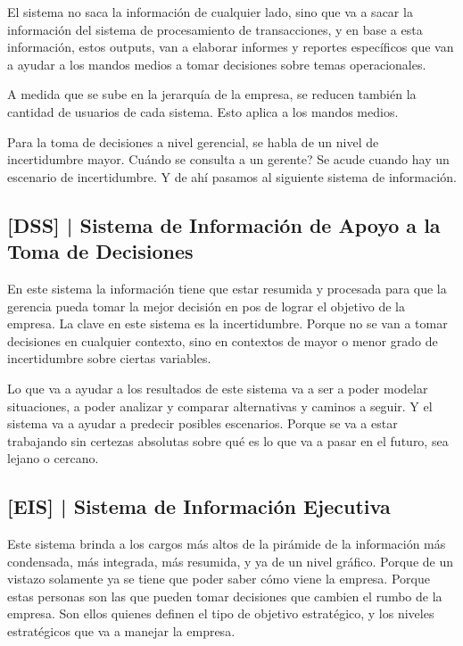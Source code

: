 El sistema no saca la información de cualquier lado, sino que va a sacar
la información del sistema de procesamiento de transacciones, y en base
a esta información, estos outputs, van a elaborar informes y reportes
específicos que van a ayudar a los mandos medios a tomar decisiones
sobre temas operacionales.

A medida que se sube en la jerarquía de la empresa, se reducen también
la cantidad de usuarios de cada sistema. Esto aplica a los mandos
medios.

Para la toma de decisiones a nivel gerencial, se habla de un nivel de
incertidumbre mayor. Cuándo se consulta a un gerente? Se acude cuando
hay un escenario de incertidumbre. Y de ahí pasamos al siguiente sistema
de información.

\hypertarget{sistema-de-informaciuxf3n-de-apoyo-a-la-toma-de-decisiones}{%
\subsection{%
{[}DSS{]} |
Sistema de Información de Apoyo a la Toma de Decisiones
}\label{sistema-de-informaciuxf3n-de-apoyo-a-la-toma-de-decisiones}}

En este sistema la información tiene que estar resumida y procesada para
que la gerencia pueda tomar la mejor decisión en pos de lograr el
objetivo de la empresa. La clave en este sistema es la incertidumbre.
Porque no se van a tomar decisiones en cualquier contexto, sino en
contextos de mayor o menor grado de incertidumbre sobre ciertas
variables.

Lo que va a ayudar a los resultados de este sistema va a ser a poder
modelar situaciones, a poder analizar y comparar alternativas y caminos
a seguir. Y el sistema va a ayudar a predecir posibles escenarios.
Porque se va a estar trabajando sin certezas absolutas sobre qué es lo
que va a pasar en el futuro, sea lejano o cercano.

\hypertarget{sistema-de-informaciuxf3n-ejecutiva}{%
\subsection{%
{[}EIS{]} |
Sistema de Información Ejecutiva
}\label{sistema-de-informaciuxf3n-ejecutiva}}

Este sistema brinda a los cargos más altos de la pirámide de la
información más condensada, más integrada, más resumida, y ya de un
nivel gráfico. Porque de un vistazo solamente ya se tiene que poder
saber cómo viene la empresa. Porque estas personas son las que pueden
tomar decisiones que cambien el rumbo de la empresa. Son ellos quienes
definen el tipo de objetivo estratégico, y los niveles estratégicos que
va a manejar la empresa.

